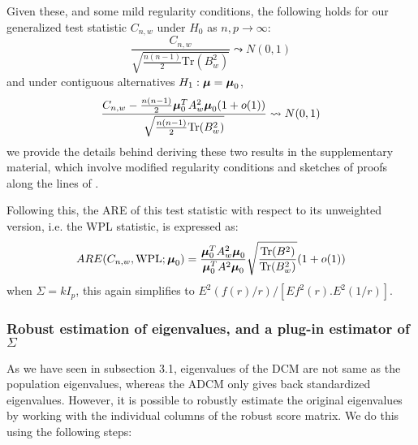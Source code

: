 \documentclass[12pt,letterpaper]{article}
\theoremstyle{definition} \newtheorem{Definition}[Theorem]{Definition}
\begin{document}
Given these, and some mild regularity conditions, the following holds for our generalized test statistic $C_{n,w}$ under $H_0$ as $n,p \rightarrow \infty$:
%
\begin{equation}\label{eqn:hdtest1}
\frac{C_{n,w}}{\sqrt{\frac{n(n-1)}{2} \text{Tr}(B_w^2)}} \leadsto N(0,1)
\end{equation}
%
and under contiguous alternatives $H_1: {\boldsymbol{\mu}} = {\boldsymbol{\mu}}_0$,
%
\begin{equation}\label{eqn:hdtest2}
\frac{C_{n,w} - \frac{n(n-1)}{2} {\boldsymbol{\mu}}_0^T A_w^2 {\boldsymbol{\mu}}_0 (1 + o(1)) }{\sqrt{\frac{n(n-1)}{2} \text{Tr}(B_w^2)}} \leadsto N(0,1)
\end{equation}
%
we provide the details behind deriving these two results in the supplementary material, which involve modified regularity conditions and sketches of proofs along the lines of \cite{WangPengLi15}.

Following this, the ARE of this test statistic with respect to its unweighted version, i.e. the WPL statistic, is expressed as:
%
$$
ARE(C_{n,w}, \text{WPL}; {\boldsymbol{\mu}}_0) = \frac{{\boldsymbol{\mu}}_0^T A_w^2 {\boldsymbol{\mu}}_0}{{\boldsymbol{\mu}}_0^T A^2 {\boldsymbol{\mu}}_0} \sqrt\frac{\text{Tr}(B^2)}{\text{Tr}(B_w^2)} (1 + o(1))
$$
%
when $\Sigma = kI_p$, this again simplifies to $E^2(f(r)/r)/[E f^2(r). E^2(1/r)]$.

\subsubsection{Robust estimation of eigenvalues, and a plug-in estimator of $\Sigma$}

As we have seen in subsection 3.1, eigenvalues of the DCM are not same as the population eigenvalues, whereas the ADCM only gives back standardized eigenvalues. However, it is possible to robustly estimate the original eigenvalues by working with the individual columns of the robust score matrix. We do this using the following steps:
\end{document}
